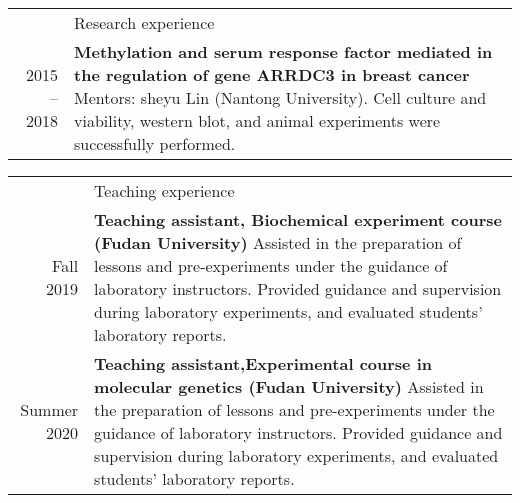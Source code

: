 \documentclass[letterpaper, 11pt]{article}
\newcommand{\headingfont}{\Large\color{OliveGreen}}
\newenvironment{SectionTable}[1]{
	\renewcommand*{\arraystretch}{1.7}
	\setlength{\tabcolsep}{10pt}
	\begin{longtable}{Rp{5.2in}} & #1 \\}
{\end{longtable}\vspace{-.3cm}}
\begin{document}
\begin{SectionTable}{\headingfont Research experience}
2015 -- 2018 &
\textbf{Methylation and serum response factor mediated in the regulation of gene ARRDC3 in breast cancer} \newline
Mentors: sheyu Lin (Nantong University). \newline
Cell culture and viability, western blot, and animal experiments were successfully performed. \\
\end{SectionTable}


\begin{SectionTable}{\headingfont Teaching experience}
Fall 2019 & 
\textbf{Teaching assistant, Biochemical experiment course (Fudan University)} \newline
Assisted in the preparation of lessons and pre-experiments under the guidance of laboratory instructors. Provided guidance and supervision during laboratory experiments, and evaluated students' laboratory reports. \\

Summer  2020 & 
\textbf{Teaching assistant,Experimental course in molecular genetics (Fudan University)} \newline
Assisted in the preparation of lessons and pre-experiments under the guidance of laboratory instructors. Provided guidance and supervision during laboratory experiments, and evaluated students' laboratory reports. 
\end{SectionTable}

\end{document}

